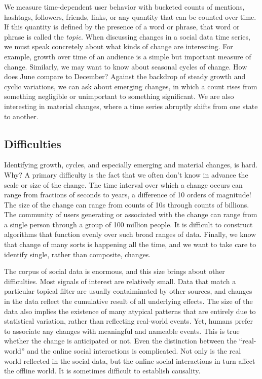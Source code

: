 \documentclass{article}
\begin{document}
We measure time-dependent user behavior with bucketed counts of mentions,
hashtags, followers, friends, links, or any quantity that can be counted
over time. If this quantity is defined by the presence of a word or
phrase, that word or phrase is called the \textit{topic}. When discussing changes
in a social data time series, we must speak concretely about what kinds of
change are interesting. For example, growth over
time of an audience is a simple but important measure of change. Similarly, we
may want to know about seasonal cycles of change. How does June compare to
December? Against the backdrop of steady growth and cyclic variations, we can
ask about emerging changes, in which a count rises from something negligible or
unimportant to something significant. We are also interesting in material
changes, where a time series abruptly shifts from one state to another.

\subsection{Difficulties}
Identifying growth, cycles, and especially emerging and material changes, is
hard. Why? A primary difficulty is the fact that we often don’t know in advance
the scale or size of the change. The time interval over which a change occurs
can range from fractions of seconds to years, a difference of 10 orders of
magnitude! The size of the change can range from counts of 10s through counts
of billions. The community of users generating or associated with the change
can range from a single person through a group of 100 million people. It is
difficult to construct algorithms that function evenly over such broad ranges
of data. Finally, we know that change of many sorts is happening all the time,
and we want to take care to identify single, rather than composite, changes.

The corpus of social data is enormous, and this size brings about
other difficulties. Most signals of interest are relatively
small.
Data that match a particular topical filter are usually contaiminated
by other sources, and changes in the data reflect the cumulative result
of all underlying effects. 
The size of the data also implies the existence of many
atypical patterns that are entirely due to statistical variation, rather than
reflecting real-world events. Yet, humans prefer to associate any changes with
meaningful and nameable events. This is true whether the change is anticipated
or not. Even the distinction between the “real-world” and the online social
interactions is complicated. Not only is the real world reflected in the social
data, but the online social interactions in turn affect the offline world.
It is sometimes difficult to establish causality.  
\end{document}
